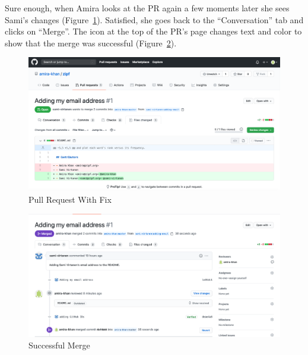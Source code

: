 \documentclass[
]{krantz}
\begin{document}
Sure enough,
when Amira looks at the PR again a few moments later she sees Sami's changes
(Figure~\ref{fig:git-advanced-pull-request-pr-with-fix}).
Satisfied,
she goes back to the ``Conversation'' tab and clicks on ``Merge''.
The icon at the top of the PR's page changes text and color to show that the merge was successful
(Figure~\ref{fig:git-advanced-pull-request-successful-merge}).

\begin{figure}

{\centering \includegraphics[width=1\linewidth]{figures/git-advanced/pr-with-fix} 

}

\caption{Pull Request With Fix}\label{fig:git-advanced-pull-request-pr-with-fix}
\end{figure}

\begin{figure}

{\centering \includegraphics[width=1\linewidth]{figures/git-advanced/pr-successful-merge} 

}

\caption{Successful Merge}\label{fig:git-advanced-pull-request-successful-merge}
\end{figure}
\end{document}
